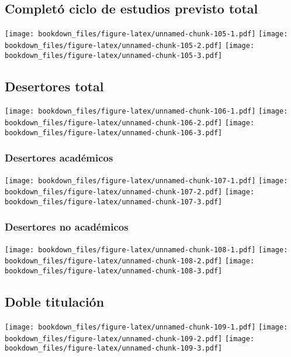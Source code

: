 \documentclass[]{article}
\theoremstyle{definition}
\theoremstyle{definition}
\theoremstyle{definition}
\theoremstyle{remark}
\begin{document}
\subsection{Completó ciclo de estudios previsto
total}\label{completo-ciclo-de-estudios-previsto-total-1}

\texttt{[image: bookdown\_files/figure-latex/unnamed-chunk-105-1.pdf]}
\texttt{[image: bookdown\_files/figure-latex/unnamed-chunk-105-2.pdf]}
\texttt{[image: bookdown\_files/figure-latex/unnamed-chunk-105-3.pdf]}

\subsection{Desertores total}\label{desertores-total-1}

\texttt{[image: bookdown\_files/figure-latex/unnamed-chunk-106-1.pdf]}
\texttt{[image: bookdown\_files/figure-latex/unnamed-chunk-106-2.pdf]}
\texttt{[image: bookdown\_files/figure-latex/unnamed-chunk-106-3.pdf]}

\subsubsection{Desertores académicos}\label{desertores-academicos}

\texttt{[image: bookdown\_files/figure-latex/unnamed-chunk-107-1.pdf]}
\texttt{[image: bookdown\_files/figure-latex/unnamed-chunk-107-2.pdf]}
\texttt{[image: bookdown\_files/figure-latex/unnamed-chunk-107-3.pdf]}

\subsubsection{Desertores no académicos}\label{desertores-no-academicos}

\texttt{[image: bookdown\_files/figure-latex/unnamed-chunk-108-1.pdf]}
\texttt{[image: bookdown\_files/figure-latex/unnamed-chunk-108-2.pdf]}
\texttt{[image: bookdown\_files/figure-latex/unnamed-chunk-108-3.pdf]}

\subsection{Doble titulación}\label{doble-titulacion}

\texttt{[image: bookdown\_files/figure-latex/unnamed-chunk-109-1.pdf]}
\texttt{[image: bookdown\_files/figure-latex/unnamed-chunk-109-2.pdf]}
\texttt{[image: bookdown\_files/figure-latex/unnamed-chunk-109-3.pdf]}
\end{document}

